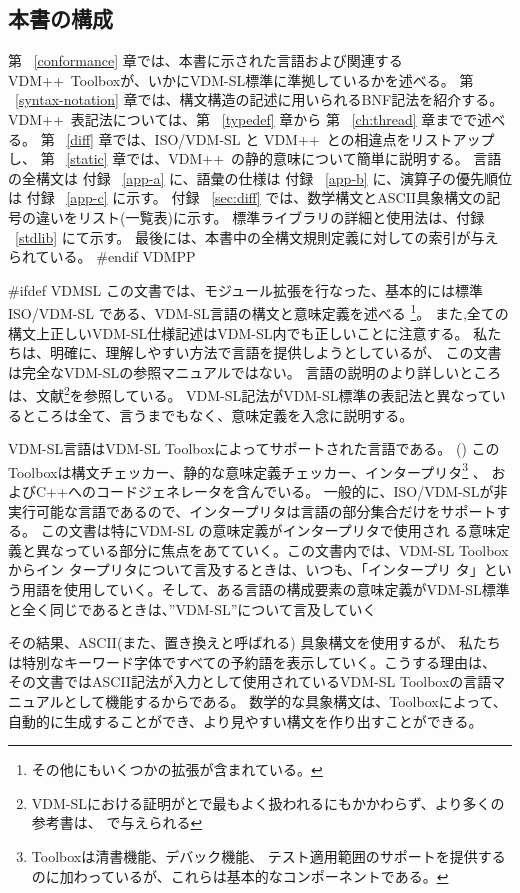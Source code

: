\documentclass[\pformat,12pt]{jarticle}
\newcommand{\vdmsl}{VDM-SL}
\newcommand{\vdmpp}{VDM++}
\begin{document}
\subsection{本書の構成}

第 ~\ref{conformance} 章では、本書に示された言語および関連する \vdmpp\ Toolboxが、いかにVDM-SL標準に準拠しているかを述べる。
第 ~\ref{syntax-notation} 章では、構文構造の記述に用いられるBNF記法を紹介する。
 \vdmpp\ 表記法については、第 ~\ref{typedef} 章から 第 ~\ref{ch:thread} 章までで述べる。
第 ~\ref{diff} 章では、ISO/VDM-SL と  \vdmpp\ との相違点をリストアップし、
第 ~\ref{static} 章では、\vdmpp\ の静的意味について簡単に説明する。
言語の全構文は 付録 ~\ref{app-a} に、語彙の仕様は 付録 ~\ref{app-b} に、演算子の優先順位は 付録 ~\ref{app-c} に示す。
付録 ~\ref{sec:diff} では、数学構文とASCII具象構文の記号の違いをリスト(一覧表)に示す。
標準ライブラリの詳細と使用法は、付録 ~\ref{stdlib} にて示す。
最後には、本書中の全構文規則定義に対しての索引が与えられている。
#endif VDMPP

#ifdef VDMSL
この文書では、モジュール拡張を行なった、基本的には標準ISO/VDM-SL \cite{ISOVDM96}である、VDM-SL言語の構文と意味定義を述べる
\footnote{その他にもいくつかの拡張が含まれている。}。
また,全ての構文上正しい{\vdmsl}仕様記述は{\vdmsl}内でも正しいことに注意する。
私たちは、明確に、理解しやすい方法で言語を提供しようとしているが、
この文書は完全な{\vdmsl}の参照マニュアルではない。
言語の説明のより詳しいところは、文献\footnote{VDM-SLにおける証明が\cite{Jones90a}と\cite{Bicarregui&94}で最もよく扱われるにもかかわらず、より多くの参考書は、
\cite{Fitzgerald&98}で与えられる}を参照している。
VDM-SL記法がVDM-SL標準の表記法と異なっているところは全て、言うまでもなく、意味定義を入念に説明する。

VDM-SL言語はVDM-SL Toolboxによってサポートされた言語である。
(\cite{UserMan-SCSK})
このToolboxは構文チェッカー、静的な意味定義チェッカー、インタープリタ\footnote{Toolboxは清書機能、デバック機能、
テスト適用範囲のサポートを提供するのに加わっているが、これらは基本的なコンポーネントである。} 、
およびC++へのコードジェネレータを含んでいる。
一般的に、ISO/VDM-SLが非実行可能な言語であるので、インタープリタは言語の部分集合だけをサポートする。
この文書は特にVDM-SL の意味定義がインタープリタで使用され
る意味定義と異なっている部分に焦点をあてていく。この文書内では、VDM-SL Toolboxからイン
タープリタについて言及するときは、いつも、「インタープリ
タ」という用語を使用していく。そして、ある言語の構成要素の意味定義がVDM-SL標準
と全く同じであるときは、”VDM-SL”について言及していく

その結果、ASCII(また、置き換えと呼ばれる) 具象構文を使用するが、
私たちは特別なキーワード字体ですべての予約語を表示していく。こうする理由は、
その文書ではASCII記法が入力として使用されているVDM-SL Toolboxの言語マニュアルとして機能するからである。
数学的な具象構文は、Toolboxによって、自動的に生成することができ、より見やすい構文を作り出すことができる。
\end{document}

